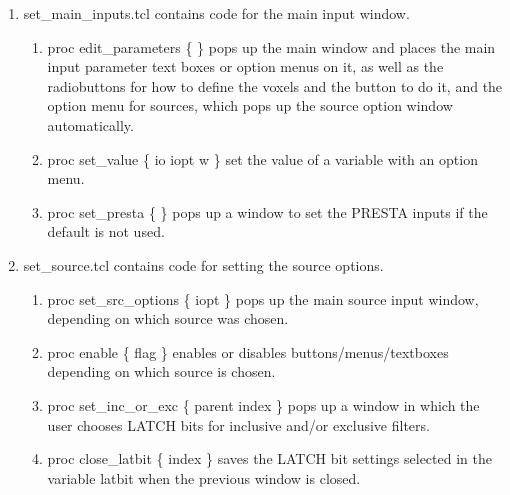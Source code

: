 \documentclass[12pt]{book}
\begin{document}
\begin{enumerate}
\item set\_main\_inputs.tcl contains code for the main input window.
\begin{enumerate}
\item proc edit\_parameters \{ \} pops up the main window and places the
main input parameter text boxes or option menus on it, as well as the
radiobuttons for how to define the voxels and the button to do it, and
the option menu for sources, which pops up the source option window
automatically.
\item proc set\_value \{ io iopt w \} set the value of a variable with
an option menu.
\item proc set\_presta \{ \} pops up a window to set the PRESTA inputs
if the default is not used.
\end{enumerate}

\item set\_source.tcl contains code for setting the source options.
\begin{enumerate}
\item proc set\_src\_options \{ iopt \} pops up the main source input
window, depending on which source was chosen.
\item proc enable \{ flag \} enables or disables buttons/menus/textboxes
depending on which source is chosen.
\item proc set\_inc\_or\_exc \{ parent index \} pops up a window in
which the user chooses LATCH bits for inclusive and/or exclusive filters.
\item proc close\_latbit \{ index \} saves the LATCH bit settings
selected in the variable latbit when the previous window is closed.
\end{enumerate}

\end{enumerate}
\end{document}
